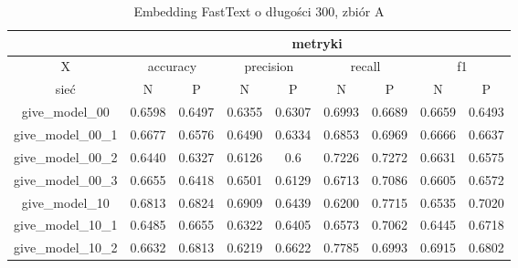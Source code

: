 \begin{table}[!h] \label{tab:wyniki_fastext_A} \centering
    \caption{Embedding FastText o długości 300, zbiór A}
    \begin{tabular}{|c|c|c|c|c|c|c|c|c|}    \hline

                                          & \multicolumn{8}{c|}{metryki}                                                                                                                               \\ \hline
        X                                 & \multicolumn{2}{c|}{accuracy} & \multicolumn{2}{c|}{precision} & \multicolumn{2}{c|}{recall} & \multicolumn{2}{c|}{f1}                                     \\ \hline
        sieć                              & N                             & P                              & N                           & P                       & N      & P      & N      & P      \\ \hline
        give\_model\_00                   & 0.6598                        & 0.6497                         & 0.6355                      & 0.6307                  & 0.6993 & 0.6689 & 0.6659 & 0.6493 \\ \hline
        give\_model\_00\_1                & 0.6677                        & 0.6576                         & 0.6490                      & 0.6334                  & 0.6853 & 0.6969 & 0.6666 & 0.6637 \\ \hline
        give\_model\_00\_2                & 0.6440                        & 0.6327                         & 0.6126                      & 0.6                     & 0.7226 & 0.7272 & 0.6631 & 0.6575 \\ \hline
        give\_model\_00\_3                & 0.6655                        & 0.6418                         & 0.6501                      & 0.6129                  & 0.6713 & 0.7086 & 0.6605 & 0.6572 \\ \hline
        give\_model\_10                   & 0.6813                        & 0.6824                         & 0.6909                      & 0.6439                  & 0.6200 & 0.7715 & 0.6535 & 0.7020 \\ \hline
        give\_model\_10\_1                & 0.6485                        & 0.6655                         & 0.6322                      & 0.6405                  & 0.6573 & 0.7062 & 0.6445 & 0.6718 \\ \hline
        give\_model\_10\_2                & 0.6632                        & 0.6813                         & 0.6219                      & 0.6622                  & 0.7785 & 0.6993 & 0.6915 & 0.6802 \\ \hline

\end{tabular}
\end{table}

